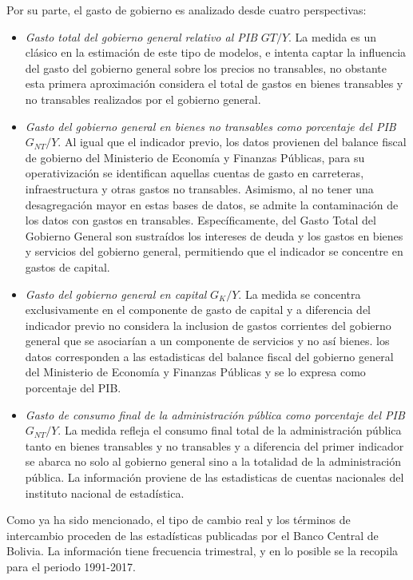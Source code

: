 \documentclass[12pt,letterpaper]{article}
\begin{document}
Por su parte, el gasto de gobierno es analizado desde cuatro perspectivas: 
\begin{itemize}
\item \emph{Gasto total del gobierno general relativo al PIB} $G{T}/Y$. La medida es un clásico en la estimación de este tipo de modelos, e intenta captar la influencia del gasto del gobierno general sobre los precios no transables, no obstante esta primera aproximación considera el total de gastos en bienes transables y no transables realizados por el gobierno general. 
\item \emph{Gasto del gobierno general en bienes no transables como porcentaje del PIB} $G_{NT}/Y$. Al igual que el indicador previo, los datos provienen del balance fiscal de gobierno del Ministerio de Economía y Finanzas  Públicas, para su operativización se identifican aquellas cuentas de gasto en carreteras, infraestructura y otras gastos no transables. Asimismo, al no tener una desagregación mayor en estas bases de datos, se admite la contaminación de los datos con gastos en transables. Específicamente, del Gasto Total del  Gobierno General son sustraídos los intereses de deuda y los gastos en bienes y servicios del gobierno general, permitiendo que el indicador se concentre en gastos de capital.
\item \emph{Gasto del gobierno general en capital} $G_{K}/Y$. La medida se concentra exclusivamente en el componente de gasto de capital y a diferencia del indicador previo no considera la inclusion de gastos corrientes del gobierno general que se asociarían a un componente de servicios y no así bienes. los datos corresponden a las estadisticas del balance fiscal del gobierno general del Ministerio de Economía y Finanzas Públicas y se lo expresa como porcentaje del PIB. 
\item \emph{Gasto de consumo final de la administración pública como porcentaje del PIB} $G_{NT}/Y$. La medida refleja el consumo final total de la administración pública tanto en bienes transables y no transables y a diferencia del primer indicador se abarca no solo al gobierno general sino a la totalidad de la administración pública. La información proviene de las estadisticas de cuentas nacionales del instituto nacional de estadística.  
\end{itemize}

Como ya ha sido mencionado, el tipo de cambio real y los términos de intercambio proceden de las estadísticas publicadas por el Banco Central de Bolivia. La información tiene frecuencia trimestral, y en lo posible se la recopila para el periodo 1991-2017. 
\end{document}
